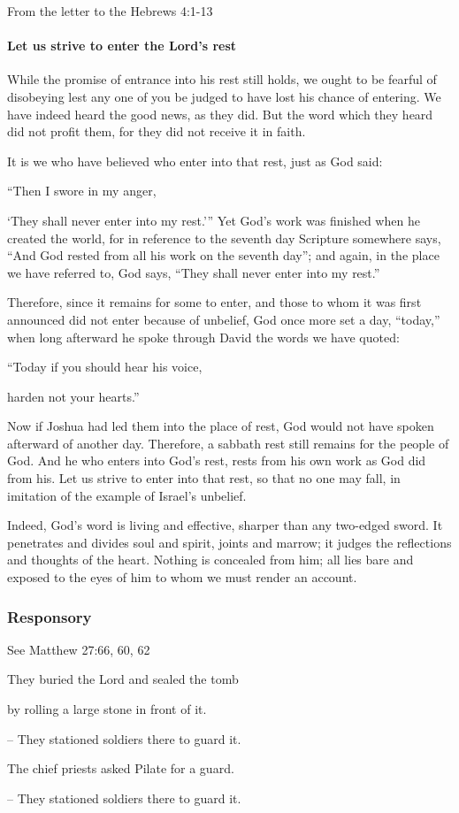 From the letter to the Hebrews \hfill 4:1-13

\paragraph{Let us strive to enter the Lord’s rest}

\lettrine[lines=3]{W}{}hile the promise of entrance into his rest still holds, we ought to be fearful of disobeying lest any one of you be judged to have lost his chance of entering. We have indeed heard the good news, as they did. But the word which they heard did not profit them, for they did not receive it in faith.

It is we who have believed who enter into that rest, just as God said:

\vspace{5pt}
 “Then I swore in my anger,\par
    ‘They shall never enter into my rest.’”
\vspace{5pt}
Yet God’s work was finished when he created the world, for in reference to the seventh day Scripture somewhere says, “And God rested from all his work on the seventh day”; and again, in the place we have referred to, God says, “They shall never enter into my rest.”

Therefore, since it remains for some to enter, and those to whom it was first announced did not enter because of unbelief, God once more set a day, “today,” when long afterward he spoke through David the words we have quoted:

\vspace{5pt}
   “Today if you should hear his voice,\par
      harden not your hearts.”
\vspace{5pt}

Now if Joshua had led them into the place of rest, God would not have spoken afterward of another day. Therefore, a sabbath rest still remains for the people of God. And he who enters into God’s rest, rests from his own work as God did from his. Let us strive to enter into that rest, so that no one may fall, in imitation of the example of Israel’s unbelief.

Indeed, God’s word is living and effective, sharper than any two-edged sword. It penetrates and divides soul and spirit, joints and marrow; it judges the reflections and thoughts of the heart. Nothing is concealed from him; all lies bare and exposed to the eyes of him to whom we must render an account.


\subsubsection{Responsory}
\hfill See Matthew 27:66, 60, 62

They buried the Lord and sealed the tomb\par
by rolling a large stone in front of it.\par
– They stationed soldiers there to guard it.\par
\vspace{5pt}
The chief priests asked Pilate for a guard.\par
– They stationed soldiers there to guard it.